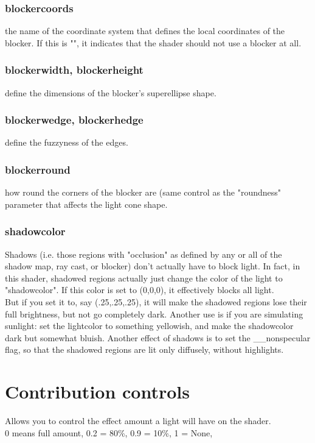 \documentclass[final,letterpaper,twoside,12pt]{report}
\begin{document}
\subsubsection {blockercoords}
the name of the coordinate system that defines the  local coordinates of the blocker.  If this is "", it indicates  that the shader should not use a blocker at all.
\smallskip
\subsubsection {blockerwidth, blockerheight }
define the dimensions of the blocker's  superellipse shape.
\smallskip
\subsubsection {blockerwedge, blockerhedge }
define the fuzzyness of the edges.
\smallskip
\subsubsection {blockerround}
how round the corners of the blocker are (same  control as the "roundness" parameter that affects the light  cone shape.
\smallskip
\subsubsection {shadowcolor }
Shadows (i.e. those regions with "occlusion" as  defined by any or all of the shadow map, ray cast, or  blocker) don't actually have to block light.  In fact, in  this shader, shadowed regions actually just change the color  of the light to "shadowcolor".  If this color is set to  (0,0,0), it effectively blocks all light.\\
But if you set it  to, say (.25,.25,.25), it will make the shadowed regions lose  their full brightness, but not go completely dark.  Another  use is if you are simulating sunlight: set the lightcolor to  something yellowish, and make the shadowcolor dark but  somewhat bluish.  Another effect of shadows is to set the  \_\_nonspecular flag, so that the shadowed regions are lit only  diffusely, without highlights.
\smallskip
\section {Contribution controls}
Allows you to control the effect amount a light will have on the shader.\\
0 means full amount, 0.2 = 80\%, 0.9 = 10\%, 1 = None, 
\end{document}
